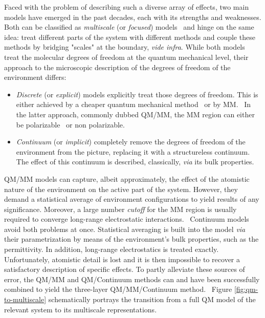 Faced with the problem of describing such a diverse array of effects,
two main models have emerged in the past decades, each with its
strengths and weaknesses.
Both can be classified as \emph{multiscale} (or \emph{focused})
models~\autocite{Nobel2013} and hinge on the same idea: treat different
parts of the system with different methods and couple these methods by
bridging "scales" at the boundary, \emph{vide infra}.
While both models treat the molecular degrees of freedom at the quantum
mechanical level, their approach to the microscopic description of the
degrees of freedom of the environment differs:
\begin{itemize}
 \item
   \emph{Discrete} (or \emph{explicit}) models explicitly treat those
   degrees of freedom.
   This is either achieved by a cheaper quantum mechanical
   method~\autocite{Vreven2006-gx} or by \ac{MM}.~\autocite{Senn2009-sk}
   In the latter approach, commonly dubbed \acs{QM}/\acs{MM}, the \acs{MM}
   region can either be polarizable~\autocite{MMPol} or non
   polarizable.~\autocite{MM}
 \item
   \emph{Continuum} (or \emph{implicit}) completely remove the degrees
   of freedom of the environment from the picture, replacing it with a
   structureless continuum.
   The effect of this continuum is described, classically, \emph{via}
   its bulk properties.~\autocite{Onsager1936-wf, Miertus1981-mm}
\end{itemize}
\acs{QM}/\acs{MM} models can capture, albeit approximately, the effect
of the atomistic nature of the environment on the active part of the
system.
However, they demand a statistical average of environment configurations
to yield results of any significance. Moreover, a large number
\emph{cutoff} for the \acs{MM} region is usually required to converge
long-range electrostatic interactions.~\autocite{Something here??}
Continuum models avoid both problems at once. Statistical averaging is
built into the model \emph{via} their parametrization by
means of the environment's bulk properties, such as the permittivity.
In addition, long-range electrostatics is treated exactly.
Unfortunately, atomistic detail is lost and it is then impossible to
recover a satisfactory description of specific effects.
To partly alleviate these sources of error, the \acs{QM}/\acs{MM} and
\acs{QM}/Continuum methods can and have been successfully combined to
yield the three-layer \acs{QM}/\acs{MM}/Continuum method.~\autocite{Curutchet, Steindal Lipparini}
Figure \ref{fig:qm-to-multiscale} schematically portrays the transition
from a full \acs{QM} model of the relevant system to its multiscale
representations.

